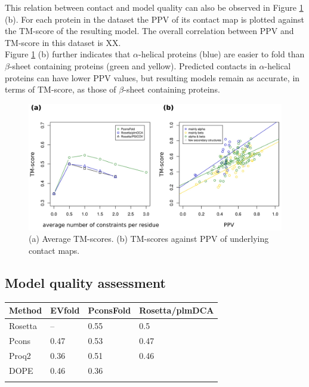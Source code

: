 \documentclass{bioinfo}
\begin{document}
This relation between contact and model quality can also be observed in Figure \ref{fig:main} (b). For each protein in the dataset the PPV of its contact map is plotted against the TM-score of the resulting model. The overall correlation between PPV and TM-score in this dataset is XX. \\\indent
Figure \ref{fig:main} (b) further indicates that $\alpha$-helical proteins (blue) are easier to fold than $\beta$-sheet containing proteins (green and yellow). Predicted contacts in $\alpha$-helical proteins can have lower PPV values, but resulting models remain as accurate, in terms of TM-score, as those of $\beta$-sheet containing proteins. 

\begin{figure}[!tpb]%
    \centerline{\includegraphics[scale=0.49]{figures/tmscores.jpg}}
\caption{(a) Average TM-scores. (b) TM-scores against PPV of underlying contact maps.}\label{fig:main}
\end{figure}

\subsection{Model quality assessment}

\begin{table}[!t]
{\begin{tabular}{llll}\toprule
    Method  & EVfold & PconsFold & Rosetta/plmDCA \\ \midrule
    Rosetta & --     & 0.55     & 0.5          \\
    Pcons   & 0.47  & 0.53     & 0.47          \\
    Proq2   & 0.36  & 0.51     & 0.46          \\
    DOPE    & 0.46  & 0.36     & ~              \\ \botrule
\end{tabular}}{}
\end{table}
\end{document}
